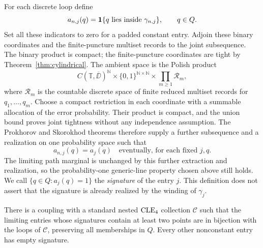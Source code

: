 For each discrete loop define
\[
 a_{n,j}(q)=\mathbf 1\{q\text{ lies inside }\gamma_{n,j}\},\qquad q\in Q.
\]
Set all these indicators to zero for a padded constant entry.
Adjoin these binary coordinates and the finite-puncture multiset records to the joint subsequence. The binary product is compact; the finite-puncture coordinates are tight by Theorem~\ref{thm:cylindrical}. The ambient space is the Polish product
\[
 C(\mathbb T,\overline{\DD})^{\mathbb N}
 \times\{0,1\}^{\mathbb N\times\mathbb N}
 \times\prod_{m\ge1}\mathcal R_m,
\]
where $\mathcal R_m$ is the countable discrete space of finite reduced multiset records for $q_1,\ldots,q_m$. Choose a compact restriction in each coordinate with a summable allocation of the error probability. Their product is compact, and the union bound proves joint tightness without any independence assumption. The Prokhorov and Skorokhod theorems \cite[Theorems~4.1 and~3.3]{Billingsley} therefore supply a further subsequence and a realization on one probability space such that
\begin{equation}\label{eq:signature-stability}
 a_{n,j}(q)=a_j(q)\quad\text{eventually, for each fixed }j,q.
\end{equation}
The limiting path marginal is unchanged by this further extraction and realization, so the probability-one generic-line property chosen above still holds. We call $\{q\in Q:a_j(q)=1\}$ the \emph{signature} of the entry $j$. This definition does not assert that the signature is already realized by the winding of $\gamma_j$.

\begin{lemma}\label{lem:visible-signatures}
There is a coupling with a standard nested $\mathrm{CLE}_4$ collection $\mathcal C$ such that the limiting entries whose signatures contain at least two points are in bijection with the loops of $\mathcal C$, preserving all memberships in $Q$. Every other nonconstant entry has empty signature.
\end{lemma}

